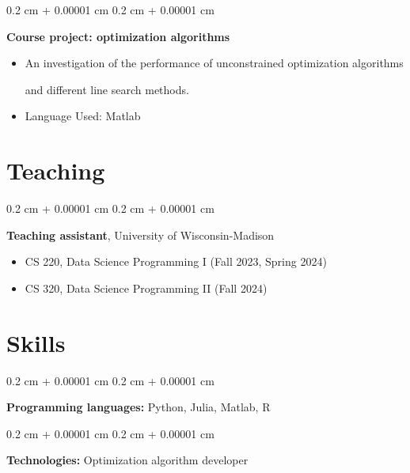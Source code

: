 \documentclass[10pt, letterpaper]{article}
\newenvironment{highlights}{
    \begin{itemize}[
        topsep=0.10 cm,
        parsep=0.10 cm,
        partopsep=0pt,
        itemsep=0pt,
        leftmargin=0.4 cm + 10pt
    ]
}{
    \end{itemize}
} %
\newenvironment{onecolentry}{
    \begin{adjustwidth}{
        0.2 cm + 0.00001 cm
    }{
        0.2 cm + 0.00001 cm
    }
}{
    \end{adjustwidth}
} %
\newenvironment{twocolentry}[2][]{
    \onecolentry
    \def\secondColumn{#2}
    \setcolumnwidth{\fill, 4.5 cm}
    \begin{paracol}{2}
}{
    \switchcolumn \raggedleft \secondColumn
    \end{paracol}
    \endonecolentry
} %
\let\hrefWithoutArrow\href
\renewcommand{\href}[2]{\hrefWithoutArrow{#1}{\ifthenelse{\equal{#2}{}}{ }{#2 }\raisebox{.15ex}{\footnotesize \faExternalLink*}}}
\begin{document}
        \vspace{0.2 cm}

        \begin{twocolentry}{
            \href{https://github.com/Tuna2222/Course-projects/tree/main/IOE-511}{IOE-511}
        }
            \textbf{Course project: optimization algorithms}
            \begin{highlights}
                \item An investigation of the performance of unconstrained optimization algorithms 
                
                and different 
                line search methods.
                \item Language Used: Matlab
            \end{highlights}
        \end{twocolentry}



    \section{Teaching}
    \begin{onecolentry}
        \textbf{Teaching assistant}, University of Wisconsin-Madison
        \begin{highlights}
            \item CS 220, Data Science Programming I (Fall 2023, Spring 2024)
            \item CS 320, Data Science Programming II (Fall 2024)
        \end{highlights}


    \end{onecolentry}



    
    \section{Skills}



        
        \begin{onecolentry}
            \textbf{Programming languages:} Python, Julia, Matlab, R
        \end{onecolentry}

        \vspace{0.2 cm}

        \begin{onecolentry}
            \textbf{Technologies:} Optimization algorithm developer
        \end{onecolentry}
\end{document}
